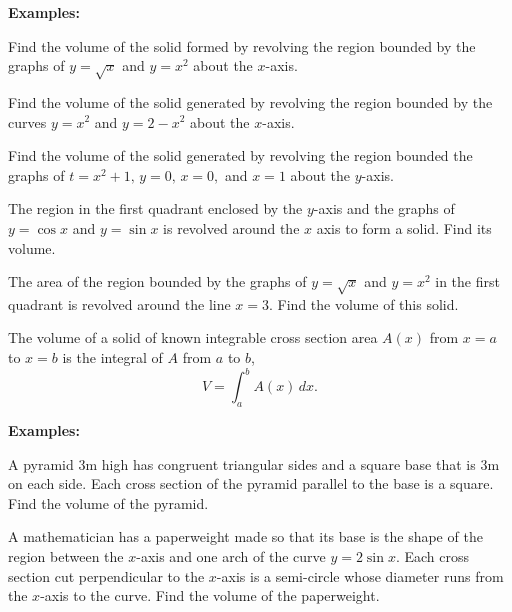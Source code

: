 \documentclass[addpoints, 12pt]{exam}
\begin{document}
\textbf{Examples:}
\begin{questions}
    \question Find the volume of the solid formed by revolving the region bounded by the graphs of $y=\sqrt{x}$ and $y=x^2$ about the $x$-axis.
    
    \question Find the volume of the solid generated by revolving the region bounded by the curves $y=x^2$ and $y=2-x^2$ about the $x$-axis.
    
    \newpage
    
    \question Find the volume of the solid generated by revolving the region bounded the graphs of $t=x^2+1,\,y=0,\,x=0,$ and $x=1$ about the $y$-axis.
    
    \question The region in the first quadrant enclosed by the $y$-axis and the graphs of $y=\cos x$ and $y=\sin x$ is revolved around the $x$ axis to form a solid. Find its volume.
    
    \question The area of the region bounded by the graphs of $y=\sqrt{x}$ and $y=x^2$ in the first quadrant is revolved around the line $x=3$. Find the volume of this solid.
    
\end{questions}

\newpage

\begin{tcolorbox}[title= VOLUME OF KNOWN CROSS SECTION, black,sharp corners,colback=white,colbacktitle=white,coltitle=black,boxrule=1pt]

    The volume of a solid of known integrable cross section area $A(x)$ from $x=a$ to $x=b$ is the integral of $A$ from $a$ to $b$,
    \[V=\int_a^b A(x)\,dx.\]
    
\end{tcolorbox}
\textbf{Examples:}

\begin{questions}
    \question A pyramid 3m high has congruent triangular sides and a square base that is 3m on each side. Each cross section of the pyramid parallel to the base is a square. Find the volume of the pyramid.
    
    
    \question A mathematician has a paperweight made so that its base is the shape of the region between the $x$-axis and one arch of the curve $y=2\sin x$. Each cross section cut perpendicular to the $x$-axis is a semi-circle whose diameter runs from the $x$-axis to the curve. Find the volume of the paperweight.
\end{questions}
\end{document}
